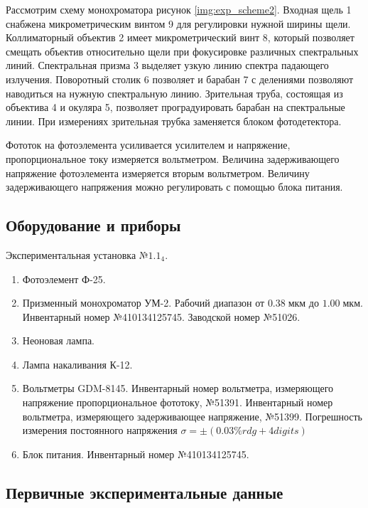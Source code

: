 \documentclass[10pt,a4paper]{article}
\newcommand{\um}{\; мкм}
\begin{document}
	Рассмотрим схему монохроматора рисунок \ref{img:exp_scheme2}. Входная щель 1 снабжена микрометрическим винтом 9 для регулировки нужной ширины щели. Коллиматорный объектив 2 имеет микрометрический винт 8, который позволяет смещать объектив относительно щели при фокусировке различных спектральных линий. Спектральная призма 3 выделяет узкую линию спектра падающего излучения. Поворотный столик 6 позволяет и барабан 7 с делениями позволяют наводиться на нужную спектральную линию. Зрительная труба, состоящая из объектива 4 и окуляра 5, позволяет проградуировать барабан на спектральные линии. При измерениях зрительная трубка заменяется блоком фотодетектора. 
	
	Фототок на фотоэлемента усиливается усилителем и напряжение, пропорциональное току измеряется вольтметром. Величина задерживающего напряжение фотоэлемента измеряется вторым вольтметром. Величину задерживающего напряжения можно регулировать с помощью блока питания.

	\subsection*{Оборудование и приборы}
	
	Экспериментальная установка $№1.1_4$.
	
	\begin{enumerate}
		\item Фотоэлемент Ф-25.
		
		\item Призменный монохроматор УМ-2. Рабочий диапазон от $0.38 \um$ до $1.00 \um$. Инвентарный номер №410134125745. Заводской номер №51026.
		
		\item Неоновая лампа.
		
		\item Лампа накаливания К-12.
		
		\item Вольтметры GDM-8145. Инвентарный номер вольтметра, измеряющего напряжение пропорциональное фототоку, №51391. Инвентарный номер вольтметра, измеряющего задерживающее напряжение, №51399. Погрешность измерения постоянного напряжения $\sigma = \pm (0.03\% rdg + 4 digits)$
		
		\item Блок питания. Инвентарный номер №410134125745.
	\end{enumerate}
	
	\subsection*{Первичные экспериментальные данные}
	
\end{document}
